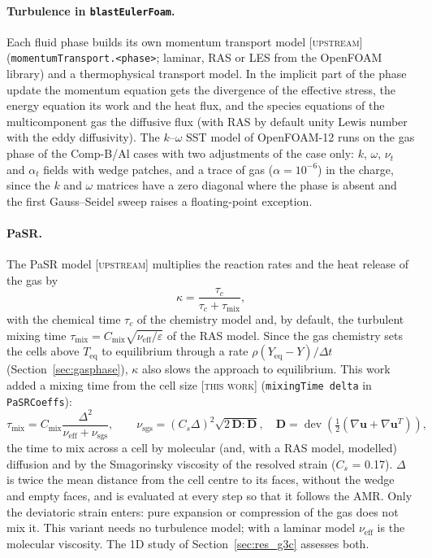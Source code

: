 \documentclass{article}
\newcommand{\up}{\textsc{[upstream]}}
\newcommand{\tw}{\textsc{[this work]}}
\begin{document}
\paragraph{Turbulence in \texttt{blastEulerFoam}.} Each fluid phase builds its own momentum transport model \up{} (\texttt{momentumTransport.<phase>}; laminar, RAS or LES from the OpenFOAM library) and a thermophysical transport model. In the implicit part of the phase update the momentum equation gets the divergence of the effective stress, the energy equation its work and the heat flux, and the species equations of the multicomponent gas the diffusive flux (with RAS by default unity Lewis number with the eddy diffusivity). The $k$--$\omega$ SST model of OpenFOAM-12 runs on the gas phase of the Comp-B/Al cases with two adjustments of the case only: $k$, $\omega$, $\nu_t$ and $\alpha_t$ fields with wedge patches, and a trace of gas ($\alpha = 10^{-6}$) in the charge, since the $k$ and $\omega$ matrices have a zero diagonal where the phase is absent and the first Gauss--Seidel sweep raises a floating-point exception.

\paragraph{PaSR.} The PaSR model \up{} multiplies the reaction rates and the heat release of the gas by
\begin{equation}
    \kappa = \frac{\tau_c}{\tau_c + \tau_\text{mix}},
\end{equation}
with the chemical time $\tau_c$ of the chemistry model and, by default, the turbulent mixing time $\tau_\text{mix} = C_\text{mix}\sqrt{\nu_\text{eff}/\varepsilon}$ of the RAS model. Since the gas chemistry sets the cells above $T_\text{eq}$ to equilibrium through a rate $\rho(Y_\text{eq} - Y)/\Delta t$ (Section~\ref{sec:gasphase}), $\kappa$ also slows the approach to equilibrium. This work added a mixing time from the cell size \tw{} (\texttt{mixingTime delta} in \texttt{PaSRCoeffs}):
\begin{equation}
    \tau_\text{mix} = C_\text{mix}\frac{\Delta^2}{\nu_\text{eff} + \nu_\text{sgs}}, \qquad \nu_\text{sgs} = (C_s\Delta)^2\sqrt{2\,\mathbf{D}:\mathbf{D}}, \quad \mathbf{D} = \operatorname{dev}\left(\tfrac12(\nabla\mathbf{u} + \nabla\mathbf{u}^T)\right),
\end{equation}
the time to mix across a cell by molecular (and, with a RAS model, modelled) diffusion and by the Smagorinsky viscosity of the resolved strain ($C_s$ = 0.17). $\Delta$ is twice the mean distance from the cell centre to its faces, without the wedge and empty faces, and is evaluated at every step so that it follows the AMR. Only the deviatoric strain enters: pure expansion or compression of the gas does not mix it. This variant needs no turbulence model; with a laminar model $\nu_\text{eff}$ is the molecular viscosity. The 1D study of Section~\ref{sec:res_g3c} assesses both.
\end{document}
